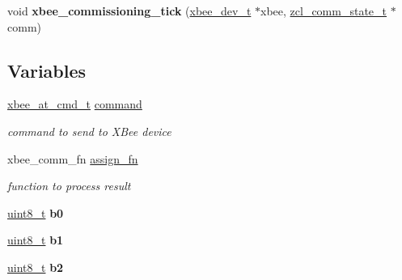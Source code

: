 \begin{DoxyCompactItemize}
\item 
\hypertarget{group__xbee__commissioning_gadd6acaa6c6403e9371358da445f3f194}{void {\bfseries xbee\-\_\-commissioning\-\_\-tick} (\hyperlink{structxbee__dev__t}{xbee\-\_\-dev\-\_\-t} $\ast$xbee, \hyperlink{structzcl__comm__state__t}{zcl\-\_\-comm\-\_\-state\-\_\-t} $\ast$comm)}\label{group__xbee__commissioning_gadd6acaa6c6403e9371358da445f3f194}

\end{DoxyCompactItemize}
\subsection*{Variables}
\begin{DoxyCompactItemize}
\item 
\hypertarget{group__xbee__commissioning_gaa1e66c60bb56acaced6ca2646fd44616}{\hyperlink{unionxbee__at__cmd__t}{xbee\-\_\-at\-\_\-cmd\-\_\-t} \hyperlink{group__xbee__commissioning_gaa1e66c60bb56acaced6ca2646fd44616}{command}}\label{group__xbee__commissioning_gaa1e66c60bb56acaced6ca2646fd44616}

\begin{DoxyCompactList}\small\item\em command to send to X\-Bee device \end{DoxyCompactList}\item 
\hypertarget{group__xbee__commissioning_ga7cde42d4d91d04d62d5810e84cde3228}{xbee\-\_\-comm\-\_\-fn \hyperlink{group__xbee__commissioning_ga7cde42d4d91d04d62d5810e84cde3228}{assign\-\_\-fn}}\label{group__xbee__commissioning_ga7cde42d4d91d04d62d5810e84cde3228}

\begin{DoxyCompactList}\small\item\em function to process result \end{DoxyCompactList}\item 
\hypertarget{group__xbee__commissioning_ga9428f4229e2203fa643916ca52a3e663}{\hyperlink{group__hal_gae1affc9ca37cfb624959c866a73f83c2}{uint8\-\_\-t} {\bfseries b0}}\label{group__xbee__commissioning_ga9428f4229e2203fa643916ca52a3e663}

\item 
\hypertarget{group__xbee__commissioning_gac252074002fd2018498430cf078d3c48}{\hyperlink{group__hal_gae1affc9ca37cfb624959c866a73f83c2}{uint8\-\_\-t} {\bfseries b1}}\label{group__xbee__commissioning_gac252074002fd2018498430cf078d3c48}

\item 
\hypertarget{group__xbee__commissioning_gaf1d156a71c42f5c2c5b2554084b0b6de}{\hyperlink{group__hal_gae1affc9ca37cfb624959c866a73f83c2}{uint8\-\_\-t} {\bfseries b2}}\label{group__xbee__commissioning_gaf1d156a71c42f5c2c5b2554084b0b6de}


\end{DoxyCompactItemize}
